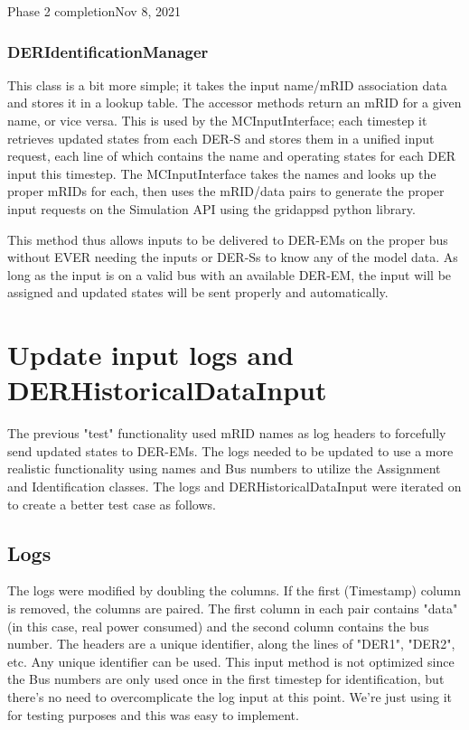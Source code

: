 \begin{entry}{Phase 2 completion}{Nov 8, 2021}
    \subsubsection*{DERIdentificationManager}
    This class is a bit more simple; it takes the input name/mRID association data and stores it in a lookup table.
    The accessor methods return an mRID for a given name, or vice versa. This is used by the MCInputInterface; each
    timestep it retrieves updated states from each DER-S and stores them in a unified input request, each line of which
    contains the name and operating states for each DER input this timestep. The MCInputInterface takes the names and
    looks up the proper mRIDs for each, then uses the mRID/data pairs to generate the proper input requests on the
    Simulation API using the gridappsd python library.

    This method thus allows inputs to be delivered to DER-EMs on the proper bus without EVER needing the inputs or
    DER-Ss to know any of the model data. As long as the input is on a valid bus with an available DER-EM, the input
    will be assigned and updated states will be sent properly and automatically.

    \section*{Update input logs and DERHistoricalDataInput}
    The previous "test" functionality used mRID names as log headers to forcefully send updated states to DER-EMs. The
    logs needed to be updated to use a more realistic functionality using names and Bus numbers to utilize the
    Assignment and Identification classes. The logs and DERHistoricalDataInput were iterated on to create a better test
    case as follows.

    \subsection*{Logs}
    The logs were modified by doubling the columns. If the first (Timestamp) column is removed, the columns are paired.
    The first column in each pair contains "data" (in this case, real power consumed) and the second column contains the
    bus number. The headers are a unique identifier, along the lines of "DER1", "DER2", etc. Any unique identifier can
    be used. This input method is not optimized since the Bus numbers are only used once in the first timestep for
    identification, but there's no need to overcomplicate the log input at this point. We're just using it for testing
    purposes and this was easy to implement.


\end{entry}
